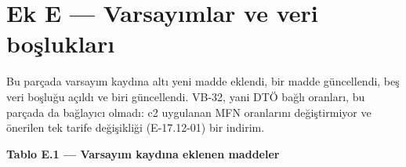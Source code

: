 \hypertarget{nace_kartlar_16-18-ek-e--varsayux131mlar-ve-veri-boux15fluklarux131}{%
\section{Ek E --- Varsayımlar ve veri boşlukları}\label{nace_kartlar_16-18-ek-e--varsayux131mlar-ve-veri-boux15fluklarux131}}

Bu parçada varsayım kaydına altı yeni madde eklendi, bir madde güncellendi, beş veri boşluğu açıldı ve biri güncellendi. VB-32, yani DTÖ bağlı oranları, bu parçada da bağlayıcı olmadı: c2 uygulanan MFN oranlarını değiştirmiyor ve önerilen tek tarife değişikliği (E-17.12-01) bir indirim.


\textbf{Tablo E.1 --- Varsayım kaydına eklenen maddeler}

\nopagebreak[4]

\begingroup\gbtablo\small

